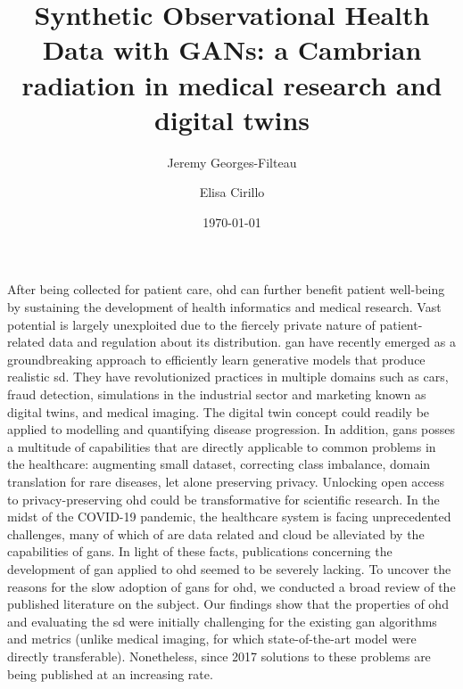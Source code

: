 \documentclass[10pt]{article}
\renewenvironment{abstract}
 {{\bfseries\noindent{\abstractname}\par\nobreak}\footnotesize}
 {\bigskip}
\begin{document}
    

    \title{Synthetic Observational Health Data with GANs: a Cambrian radiation in medical research and digital twins}
    
    \author[1,2]{Jeremy Georges-Filteau}%
    \author[2]{Elisa Cirillo}%


    \vspace{-1em}

    \date{\today}

    \begingroup
    \let\center\flushleft
    \let\endcenter\endflushleft
    \maketitle
    \endgroup


    \glsresetall
    \begin{abstract}
    After being collected for patient care, \gls{ohd} can further benefit patient well-being by sustaining the development of health informatics and medical research. Vast potential is largely unexploited due to the fiercely private nature of patient-related data and regulation about its distribution. \gls{gan} have recently emerged as a groundbreaking approach to efficiently learn generative models that produce realistic \gls{sd}. They have revolutionized practices in multiple domains such as 
     cars, fraud detection, simulations in the industrial sector and marketing known as digital twins, and medical imaging. The digital twin concept could readily be applied to modelling and quantifying disease progression. In addition, \glspl{gan} posses a multitude of capabilities that are directly applicable to common problems in the healthcare: augmenting small dataset, correcting class imbalance, domain translation for rare diseases, let alone preserving privacy. Unlocking open access to privacy-preserving \gls{ohd} could be transformative for scientific research. In the midst of the COVID-19 pandemic, the healthcare system is facing unprecedented challenges, many of which of are data related and cloud be alleviated by the capabilities of \glspl{gan}. In light of these facts, publications concerning the development of  \gls{gan} applied to \gls{ohd} seemed to be severely lacking. To uncover the reasons for the slow adoption of \glspl{gan} for \gls{ohd}, we conducted a broad review of the published literature on the subject. Our findings show that the properties of \gls{ohd} and evaluating the \gls{sd} were initially challenging for the existing \gls{gan} algorithms and metrics (unlike medical imaging, for which state-of-the-art model were directly transferable). Nonetheless, since 2017 solutions to these problems are being published at an increasing rate.
    \end{abstract}

    
    
    
    
    
    

    \pagebreak

    \printglossary[type=oalgo]
    \printglossary[type=\acronymtype]

    \pagebreak

    
\end{document}
